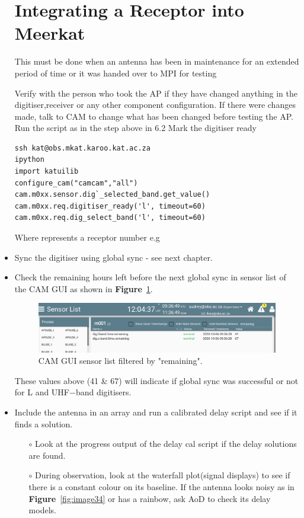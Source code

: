 \begin{itemize}
\section{Integrating a Receptor into Meerkat}
This must be done when an antenna has been in maintenance for an extended period of time or it was handed over to MPI for testing

Verify with the person who took the AP if they have changed anything in the digitiser,receiver or any other component configuration.
If there were changes made, talk to CAM to change what has been changed before testing the AP.
Run the  script as in the step above in 6.2
Mark the digitiser ready 
\begin{lstlisting}[style=DOS]
ssh kat@obs.mkat.karoo.kat.ac.za
ipython			
import katuilib
configure_cam("camcam","all")
cam.m0xx.sensor.dig`_selected_band.get_value()
cam.m0xx.req.digitiser_ready('l', timeout=60)
cam.m0xx.req.dig_select_band('l', timeout=60)
\end{lstlisting}




Where  represents a receptor number e.g 

\item{} Sync the digitiser using global sync - see next chapter.
\item{} Check the remaining hours left before the next global sync in sensor list of the CAM GUI as shown in \textbf{Figure}~\ref{fig:image68}.


\begin{figure}[!thb]
	\centering
	\includegraphics[scale=0.25]{Chapters/images/image68.png}
	
	\caption{CAM GUI sensor list filtered by "remaining".}
	\label{fig:image68}
\end{figure}

These values above (41 \& 67) will indicate if global sync was successful or not for L and UHF$-$band digitisers.

\item{} Include the antenna in an array and run a calibrated delay script and see if it finds a solution. 
\begin{itemize}
\item [$\circ$] Look at the progress output of the delay cal script if the delay solutions are found.
		\item [$\circ$] During observation, look at the waterfall plot(signal displays) to see if there is a constant colour on its baseline. If the antenna looks noisy as in \textbf{Figure}~\ref{fig:image34} or has a rainbow, ask AoD to check its delay models.
\end{itemize}
 


\end{itemize}
